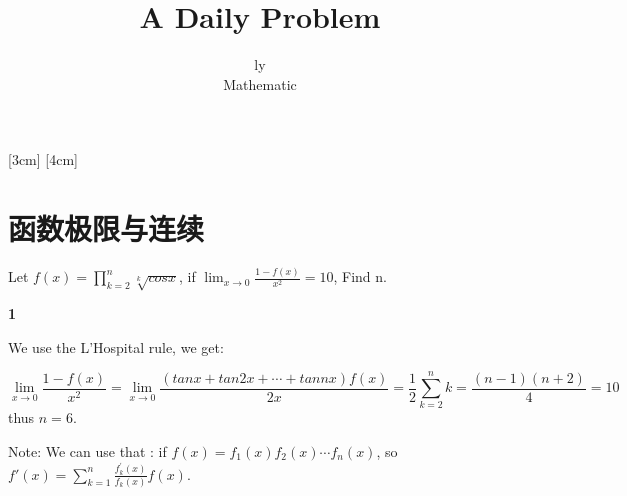\documentclass[12pt]{article}
\newenvironment{solution}[2][Solution]{\begin{trivlist}
\item[\hskip \labelsep {\bfseries #1}]}{\end{trivlist}}
\newenvironment{problem}[2][Problem]{\begin{trivlist}
\item[\hskip \labelsep {\bfseries #1}\hskip \labelsep {\bfseries #2.}]}{\end{trivlist}}
\begin{document}
 
 
\title{A Daily Problem}%
\author{ly\\ %
Mathematic} %
 
\maketitle

\tableofcontents

              [3cm]  
              {\bf \large}%
              {\contentslabel{2.5em}}%
              {}%
              {\titlerule*[0.5pc]{$\cdot$}\contentspage\hspace*{3cm}}%
              [4cm]  
              {\bf \normalsize}%
              {\contentslabel{2.5em}}%
              {}%
              {\titlerule*[0.5pc]{$\cdot$}\contentspage\hspace*{3cm}}%



\clearpage


\section{函数极限与连续}

\begin{problem}{1}
    Let $\displaystyle f(x) = \prod_{k=2}^{n}\sqrt[k]{cosx}$, if $\displaystyle \lim_{x \to 0}\frac{1-f(x)}{x^2} = 10$, Find n. 
\end{problem}


\begin{solution}{1} \textbf{1}

    We use the L'Hospital rule, we get:

    \[
        \lim_{x\to 0} \frac{1-f(x)}{x^2} = \lim_{x \to 0} \frac{(tanx+tan2x+\cdots+tannx)f(x)}{2x} = \frac{1}{2}\sum_{k=2}^{n}k
        = \frac{(n-1)(n+2)}{4} = 10     
    \]
    thus $n = 6$.

    Note: We can use that : if $f(x) = f_1(x)f_2(x)\cdots f_n(x)$, so $\displaystyle f'(x) = \sum_{k=1}^{n} \frac{f_{k}^{'}(x)}{f_k(x)} f(x) $.
    
\end{solution}
\end{document}
